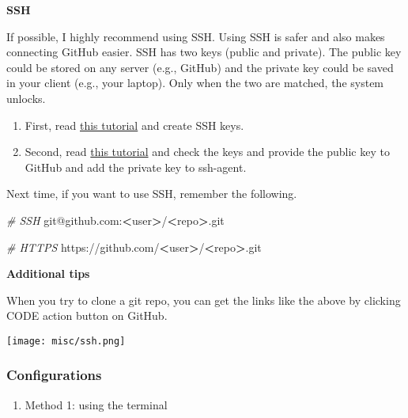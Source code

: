 \documentclass[
]{book}
\newenvironment{Shaded}{\begin{snugshade}}{\end{snugshade}}
\newcommand{\CommentTok}[1]{\textcolor[rgb]{0.56,0.35,0.01}{\textit{#1}}}
\newcommand{\ExtensionTok}[1]{#1}
\newcommand{\NormalTok}[1]{#1}
\newcommand{\OperatorTok}[1]{\textcolor[rgb]{0.81,0.36,0.00}{\textbf{#1}}}
\providecommand{\tightlist}{%
  \setlength{\itemsep}{0pt}\setlength{\parskip}{0pt}}
\begin{document}
\textbf{SSH}

If possible, I highly recommend using SSH. Using SSH is safer and also makes connecting GitHub easier. SSH has two keys (public and private). The public key could be stored on any server (e.g., GitHub) and the private key could be saved in your client (e.g., your laptop). Only when the two are matched, the system unlocks.

\begin{enumerate}
\def\labelenumi{\arabic{enumi}.}
\item
  First, read \href{https://docs.github.com/en/github/authenticating-to-github/connecting-to-github-with-ssh}{this tutorial} and create SSH keys.
\item
  Second, read \href{https://happygitwithr.com/ssh-keys.html}{this tutorial} and check the keys and provide the public key to GitHub and add the private key to ssh-agent.
\end{enumerate}

Next time, if you want to use SSH, remember the following.

\begin{Shaded}
\begin{Highlighting}[]
\CommentTok{\# SSH}
\ExtensionTok{git@github.com:}\OperatorTok{\textless{}}\NormalTok{user}\OperatorTok{\textgreater{}}\NormalTok{/}\OperatorTok{\textless{}}\NormalTok{repo}\OperatorTok{\textgreater{}}\NormalTok{.git}

\CommentTok{\# HTTPS}
\ExtensionTok{https://github.com/}\OperatorTok{\textless{}}\NormalTok{user}\OperatorTok{\textgreater{}}\NormalTok{/}\OperatorTok{\textless{}}\NormalTok{repo}\OperatorTok{\textgreater{}}\NormalTok{.git}
\end{Highlighting}
\end{Shaded}

\textbf{Additional tips}

When you try to clone a git repo, you can get the links like the above by clicking CODE action button on GitHub.

\texttt{[image: misc/ssh.png]}

\hypertarget{configurations}{%
\subsubsection{Configurations}\label{configurations}}

\begin{enumerate}
\def\labelenumi{\arabic{enumi}.}
\tightlist
\item
  Method 1: using the terminal
\end{enumerate}
\end{document}
